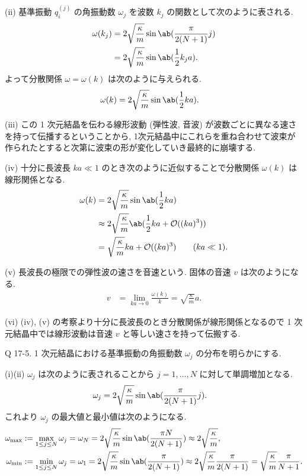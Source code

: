 \documentclass[uplatex,diffipdfmx,a4paper,11pt]{jlreq}
\theoremstyle{definition}
\begin{document}
(ii) 基準振動 $q_i^{(j)}$ の角振動数 $\omega_j$ を波数 $k_j$ の関数として次のように表される.
\begin{align}
  \omega(k_j) & = 2\sqrt{\frac{\kappa}{m}}\sin\ab(\frac{\pi}{2(N+1)}j) \\
              & = 2\sqrt{\frac{\kappa}{m}}\sin\ab(\frac{1}{2}k_ja).
\end{align}
よって分散関係 $\omega = \omega(k)$ は次のように与えられる.
\begin{align}
  \omega(k) & = 2\sqrt{\frac{\kappa}{m}}\sin\ab(\frac{1}{2}ka).
\end{align}

(iii) この 1 次元結晶を伝わる線形波動 (弾性波, 音波) が波数ごとに異なる速さを持って伝播するということから, 1次元結晶中にこれらを重ね合わせて波束が作られたとすると次第に波束の形が変化していき最終的に崩壊する.

(iv) 十分に長波長 $ka\ll 1$ のとき次のように近似することで分散関係 $\omega(k)$ は線形関係となる.
\begin{align}
  \omega(k) & = 2\sqrt{\frac{\kappa}{m}}\sin\ab(\frac{1}{2}ka)                         \\
            & \approx 2\sqrt{\frac{\kappa}{m}}\ab(\frac{1}{2}ka + \mathcal{O}((ka)^3)) \\
            & = \sqrt{\frac{\kappa}{m}}ka + \mathcal{O}((ka)^3) \qquad (ka\ll 1).
\end{align}

(v) 長波長の極限での弾性波の速さを音速という. 固体の音速 $v$ は次のようになる.
\begin{align}
  v & = \lim_{ka\to 0}\frac{\omega(k)}{k} = \sqrt{\frac{\kappa}{m}}a.
\end{align}

(vi) (iv), (v) の考察より十分に長波長のとき分散関係が線形関係となるので 1 次元結晶中では線形波動は音速 $v$ と等しい速さを持って伝搬する.

\begin{itembox}[l]{Q 17-5.}
  1 次元結晶における基準振動の角振動数 $\omega_j$ の分布を明らかにする.
\end{itembox}

(i)(ii) $\omega_j$ は次のように表されることから $j=1,\ldots,N$ に対して単調増加となる.
\begin{align}
  \omega_j & = 2\sqrt{\frac{\kappa}{m}}\sin\ab(\frac{\pi}{2(N+1)}j).
\end{align}
これより $\omega_j$ の最大値と最小値は次のようになる.
\begin{align}
  \omega_{\max} & := \max_{1\leq j\leq N}\omega_j = \omega_N = 2\sqrt{\frac{\kappa}{m}}\sin\ab(\frac{\pi N}{2(N+1)}) \approx 2\sqrt{\frac{\kappa}{m}},                                                          \\
  \omega_{\min} & := \min_{1\leq j\leq N}\omega_j = \omega_1 = 2\sqrt{\frac{\kappa}{m}}\sin\ab(\frac{\pi}{2(N+1)}) \approx 2\sqrt{\frac{\kappa}{m}}\frac{\pi}{2(N+1)} = \sqrt{\frac{\kappa}{m}}\frac{\pi}{N+1}.
\end{align}
\end{document}
